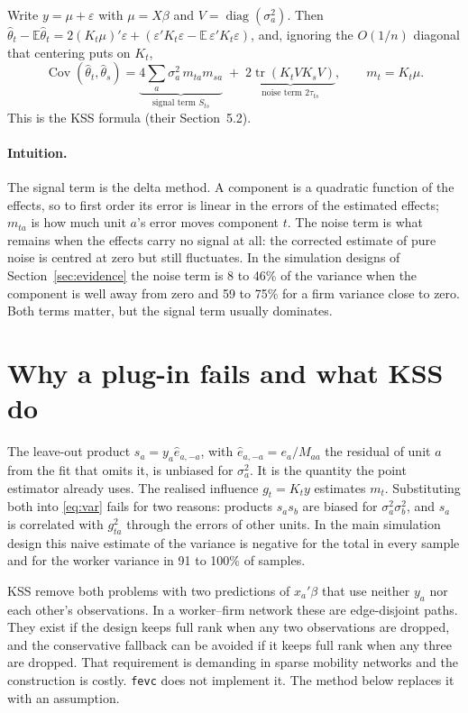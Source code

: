 \documentclass[11pt]{article}
\newcommand{\E}{\mathbb{E}}
\newcommand{\Cov}{\operatorname{Cov}}
\newcommand{\tr}{\operatorname{tr}}
\newcommand{\diag}{\operatorname{diag}}
\newcommand{\fevc}{\texttt{fevc}}
\begin{document}
Write $y=\mu+\varepsilon$ with $\mu=X\beta$ and $V=\diag(\sigma_a^2)$. Then
$\hat\theta_t-\E\hat\theta_t=2(K_t\mu)'\varepsilon+
(\varepsilon'K_t\varepsilon-\E\,\varepsilon'K_t\varepsilon)$, and, ignoring
the $O(1/n)$ diagonal that centering puts on $K_t$,
\begin{equation}\label{eq:var}
 \Cov(\hat\theta_t,\hat\theta_s)
 =\underbrace{4\sum_a\sigma_a^2\,m_{ta}m_{sa}}_{\text{signal term } S_{ts}}
 \;+\;\underbrace{2\tr(K_tVK_sV)}_{\text{noise term } 2\tau_{ts}},
 \qquad m_t=K_t\mu .
\end{equation}
This is the KSS formula (their Section~5.2).

\paragraph{Intuition.} The signal term is the delta method. A component is a
quadratic function of the effects, so to first order its error is linear in
the errors of the estimated effects; $m_{ta}$ is how much unit $a$'s error
moves component $t$. The noise term is what remains when the effects carry
no signal at all: the corrected estimate of pure noise is centred at zero but
still fluctuates. In the simulation designs of Section~\ref{sec:evidence} the
noise term is 8 to 46\% of the variance when the component is well away from
zero and 59 to 75\% for a firm variance close to zero. Both terms matter, but
the signal term usually dominates.

\section{Why a plug-in fails and what KSS do}\label{sec:plugin}

The leave-out product $s_a=y_a\hat e_{a,-a}$, with
$\hat e_{a,-a}=e_a/M_{aa}$ the residual of unit $a$ from the fit that omits
it, is unbiased for $\sigma_a^2$. It is the quantity the point estimator
already uses. The realised influence $g_t=K_ty$ estimates $m_t$. Substituting
both into \eqref{eq:var} fails for two reasons: products $s_as_b$ are biased
for $\sigma_a^2\sigma_b^2$, and $s_a$ is correlated with $g_{ta}^2$ through
the errors of other units. In the main simulation design this naive estimate
of the variance is negative for the total in every sample and for the worker
variance in 91 to 100\% of samples.

KSS remove both problems with two predictions of $x_a'\beta$ that use
neither $y_a$ nor each other's observations. In a worker--firm network these
are edge-disjoint paths. They exist if the design keeps full rank when any
two observations are dropped, and the conservative fallback can be avoided if
it keeps full rank when any three are dropped. That requirement is demanding
in sparse mobility networks and the construction is costly. \fevc{} does not
implement it. The method below replaces it with an assumption.
\end{document}
